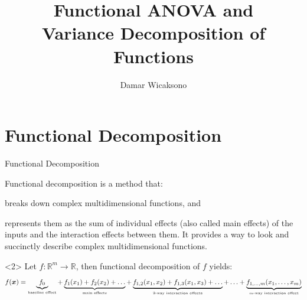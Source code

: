 \documentclass[english,aspectratio=169]{beamer}
\title[Practices of UQ in Engineering]{%
  Functional ANOVA and\protect\\
  Variance Decomposition of Functions
}
\author{Damar Wicaksono}
\let\tempone\itemize
\let\temptwo\enditemize
\renewenvironment{itemize}{\tempone\addtolength{\itemsep}{0.35\baselineskip}}{\temptwo}
\renewcommand{\emph}[1]{\textcolor[HTML]{006d2c}{\fontseries{sb}\selectfont #1}}
\begin{document}
\titleframe
\contentsframe

\section{Functional Decomposition}

\begin{frame}[fragile]{Functional Decomposition}
\small

\vspace{-2.0em}

\begin{exampleblock}{}
  \emph{Functional decomposition} is a method that:
  \vspace{1.0em}
  \begin{itemize}
    \item \emph{breaks down} complex multidimensional functions, and
    \item \emph{represents} them as the sum of \emph{individual effects} (also called \emph{main effects})
          of the inputs and the \emph{interaction effects} between them.
  \end{itemize}
  \vspace{0.5em}
  It provides a way to look and succinctly describe complex multidimensional functions.
\end{exampleblock}

\vspace{1.5em}

\begin{onlyenv}<2>
  \small
  Let $f: \mathbb{R}^m \rightarrow \mathbb{R}$, then functional decomposition of $f$ yields:
  \vspace{0.5em}
  \begin{equation*}
    f(\boldsymbol{x}) = \underbrace{f_0}_{\text{\tiny baseline effect}} + \underbrace{f_1(x_1) + f_2 (x_2) + \ldots}_{\text{\tiny main effects}} + \underbrace{f_{1, 2}(x_1, x_2) + f_{1, 3} (x_1, x_3) + \ldots}_{\text{\tiny $2$-way interaction effects}} + \ldots + \underbrace{f_{1, \ldots, m} (x_1, \ldots, x_m)}_{\text{\tiny $m$-way interaction effect}}
  \end{equation*}
  \vspace{0.5em}
\end{onlyenv}


\end{frame}
\end{document}
